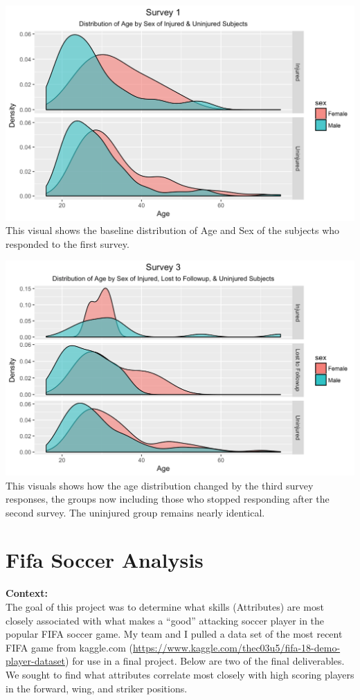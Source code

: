 \documentclass[]{article}
\begin{document}
\includegraphics[width=1\linewidth]{images/DistAgeSex1} This visual
shows the baseline distribution of Age and Sex of the subjects who
responded to the first survey.

\includegraphics[width=1\linewidth]{images/DistAgeSex3} This visuals
shows how the age distribution changed by the third survey responses,
the groups now including those who stopped responding after the second
survey. The uninjured group remains nearly identical.

\section{Fifa Soccer Analysis}\label{fifa-soccer-analysis}

\textbf{Context:}\\
The goal of this project was to determine what skills (Attributes) are
most closely associated with what makes a ``good'' attacking soccer
player in the popular FIFA soccer game. My team and I pulled a data set
of the most recent FIFA game from kaggle.com
(\url{https://www.kaggle.com/thec03u5/fifa-18-demo-player-dataset}) for
use in a final project. Below are two of the final deliverables. We
sought to find what attributes correlate most closely with high scoring
players in the forward, wing, and striker positions.
\end{document}
